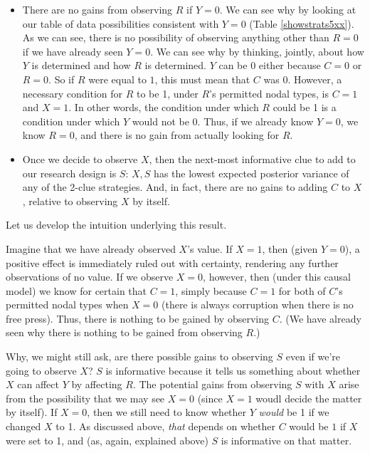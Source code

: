 \documentclass[12pt,]{book}
\begin{document}
\begin{itemize}
\item
  There are no gains from observing \(R\) if \(Y=0\). We can see why by looking at our table of data possibilities consistent with \(Y=0\) (Table \ref{showstrats5xx}). As we can see, there is no possibility of observing anything other than \(R=0\) if we have already seen \(Y=0\). We can see why by thinking, jointly, about how \(Y\) is determined and how \(R\) is determined. \(Y\) can be 0 either because \(C=0\) or \(R=0\). So if \(R\) were equal to \(1\), this must mean that \(C\) was \(0\). However, a necessary condition for \(R\) to be 1, under \(R\)'s permitted nodal types, is \(C=1\) and \(X=1\). In other words, the condition under which \(R\) could be 1 is a condition under which \(Y\) would not be 0. Thus, if we already know \(Y=0\), we know \(R=0\), and there is no gain from actually looking for \(R\).
\item
  Once we decide to observe \(X\), then the next-most informative clue to add to our research design is \(S\): \(X, S\) has the lowest expected posterior variance of any of the 2-clue strategies. And, in fact, there are no gains to adding \(C\) to \(X\), relative to observing \(X\) by itself.
\end{itemize}

Let us develop the intuition underlying this result.

Imagine that we have already observed \(X\)'s value. If \(X=1\), then (given \(Y=0\)), a positive effect is immediately ruled out with certainty, rendering any further observations of no value. If we observe \(X=0\), however, then (under this causal model) we know for certain that \(C=1\), simply because \(C=1\) for both of \(C\)'s permitted nodal types when \(X=0\) (there is always corruption when there is no free press). Thus, there is nothing to be gained by observing \(C\). (We have already seen why there is nothing to be gained from observing \(R\).)

Why, we might still ask, are there possible gains to observing \(S\) even if we're going to observe \(X\)? \(S\) is informative because it tells us something about whether \(X\) can affect \(Y\) by affecting \(R\). The potential gains from observing \(S\) with \(X\) arise from the possibility that we may see \(X=0\) (since \(X=1\) woudl decide the matter by itself). If \(X=0\), then we still need to know whether \(Y\) \emph{would} be 1 if we changed \(X\) to 1. As discussed above, \emph{that} depends on whether \(C\) would be \(1\) if \(X\) were set to 1, and (as, again, explained above) \(S\) is informative on that matter.
\end{document}
